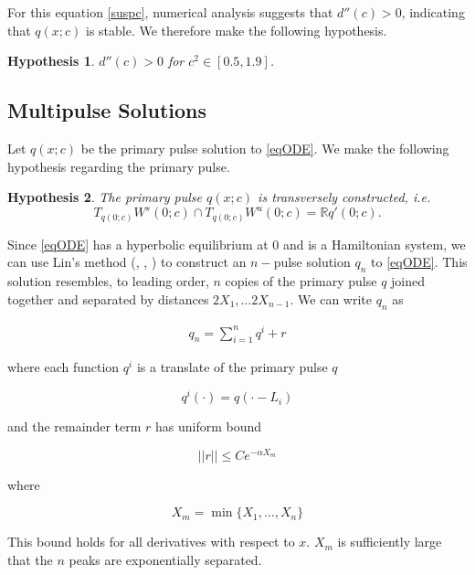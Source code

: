 \documentclass[12pt]{article}
\def\R{{\mathbb R}}
\newtheorem{hypothesis}{Hypothesis}
\begin{document}
For this equation \eqref{suspc}, numerical analysis suggests that $d''(c) > 0$, indicating that $q(x; c)$ is stable. We therefore make the following hypothesis.

\begin{hypothesis}\label{hyp_dccpos}
$d''(c) > 0$ for $c^2 \in [0.5, 1.9]$.
\end{hypothesis}

\subsection{Multipulse Solutions}

Let $q(x; c)$ be the primary pulse solution to \eqref{eqODE}. We make the following hypothesis regarding the primary pulse.

\begin{hypothesis}\label{transverseq}
The primary pulse $q(x; c)$ is transversely constructed, i.e. 
\[
T_{q(0; c)} W^s(0; c) \cap T_{q(0; c)} W^u(0; c) = \R q'(0; c).
\]
\end{hypothesis}

Since \eqref{eqODE} has a hyperbolic equilibrium at 0 and is a Hamiltonian system, we can use Lin's method (\cite{Sanstede1993}, \cite{Sandstede1997}, \cite{Sandstede1998}) to construct an $n-$pulse solution $q_n$ to \eqref{eqODE}. This solution resembles, to leading order, $n$ copies of the primary pulse $q$ joined together and separated by distances $2 X_1, \dots 2 X_{n-1}$. We can write $q_n$ as 

\begin{align}\label{qn}
q_n = \sum_{i = 1}^{n} q^i + r
\end{align}

where each function $q^i$ is a translate of the primary pulse $q$

\begin{equation}\label{qi}
q^i(\cdot) = q(\cdot - L_i)
\end{equation}

and the remainder term $r$ has uniform bound

\begin{equation}
||r|| \leq C e^{-\alpha X_m}
\end{equation}

where

\begin{equation}\label{defXm}
X_m = \min\{X_1, \dots, X_n \}
\end{equation}

This bound holds for all derivatives with respect to $x$. $X_m$ is sufficiently large that the $n$ peaks are exponentially separated.\\
\end{document}
